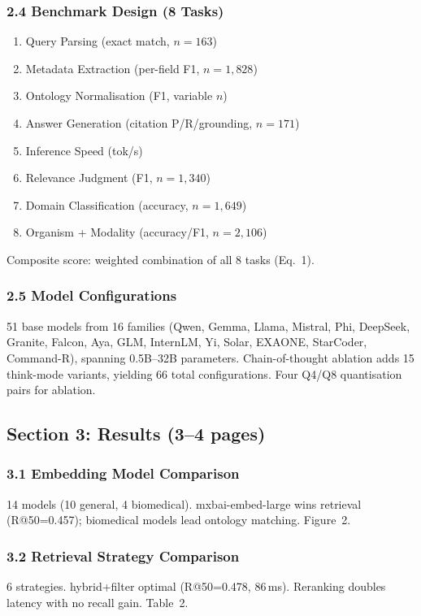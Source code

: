 \documentclass[11pt,a4paper]{article}
\begin{document}
\subsubsection{2.4 Benchmark Design (8 Tasks)}

\begin{enumerate}
  \item[A.] Query Parsing (exact match, $n=163$)
  \item[B.] Metadata Extraction (per-field F1, $n=1{,}828$)
  \item[C.] Ontology Normalisation (F1, variable $n$)
  \item[D.] Answer Generation (citation P/R/grounding, $n=171$)
  \item[E.] Inference Speed (tok/s)
  \item[F.] Relevance Judgment (F1, $n=1{,}340$)
  \item[G.] Domain Classification (accuracy, $n=1{,}649$)
  \item[H.] Organism + Modality (accuracy/F1, $n=2{,}106$)
\end{enumerate}

Composite score: weighted combination of all 8 tasks (Eq.~1).

\subsubsection{2.5 Model Configurations}

51 base models from 16 families (Qwen, Gemma, Llama, Mistral, Phi,
DeepSeek, Granite, Falcon, Aya, GLM, InternLM, Yi, Solar, EXAONE,
StarCoder, Command-R), spanning 0.5B--32B parameters. Chain-of-thought
ablation adds 15 think-mode variants, yielding 66 total configurations.
Four Q4/Q8 quantisation pairs for ablation.

\subsection{Section 3: Results (3--4 pages)}

\subsubsection{3.1 Embedding Model Comparison}
14 models (10 general, 4 biomedical). mxbai-embed-large wins retrieval
(R@50=0.457); biomedical models lead ontology matching. Figure~2.

\subsubsection{3.2 Retrieval Strategy Comparison}
6 strategies. hybrid+filter optimal (R@50=0.478, 86\,ms). Reranking
doubles latency with no recall gain. Table~2.
\end{document}
